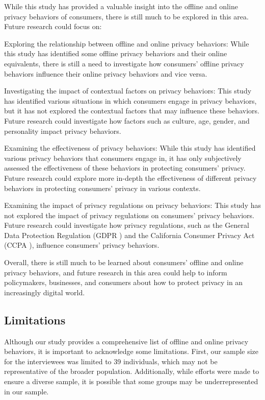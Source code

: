 While this study has provided a valuable insight into the offline and online privacy behaviors of consumers, there is still much to be explored in this area. Future research could focus on: 

Exploring the relationship between offline and online privacy behaviors: While this study has identified some offline privacy behaviors and their online equivalents, there is still a need to investigate how consumers' offline privacy behaviors influence their online privacy behaviors and vice versa. 

Investigating the impact of contextual factors on privacy behaviors: This study has identified various situations in which consumers engage in privacy behaviors, but it has not explored the contextual factors that may influence these behaviors. Future research could investigate how factors such as culture, age, gender, and personality impact privacy behaviors. 

Examining the effectiveness of privacy behaviors: While this study has identified various privacy behaviors that consumers engage in, it has only subjectively assessed the effectiveness of these behaviors in protecting consumers' privacy. Future research could explore more in-depth the effectiveness of different privacy behaviors in protecting consumers' privacy in various contexts. 

Examining the impact of privacy regulations on privacy behaviors: This study has not explored the impact of privacy regulations on consumers' privacy behaviors. Future research could investigate how privacy regulations, such as the General Data Protection Regulation (GDPR \cite{gdpr}) and the California Consumer Privacy Act (CCPA \cite{ccpa}), influence consumers' privacy behaviors. 

Overall, there is still much to be learned about consumers' offline and online privacy behaviors, and future research in this area could help to inform policymakers, businesses, and consumers about how to protect privacy in an increasingly digital world. 

\subsection{Limitations}
\label{Label2}

Although our study provides a comprehensive list of offline and online privacy behaviors, it is important to acknowledge some limitations. First, our sample size for the interviewees was limited to 39 individuals, which may not be representative of the broader population. Additionally, while efforts were made to ensure a diverse sample, it is possible that some groups may be underrepresented in our sample. 

